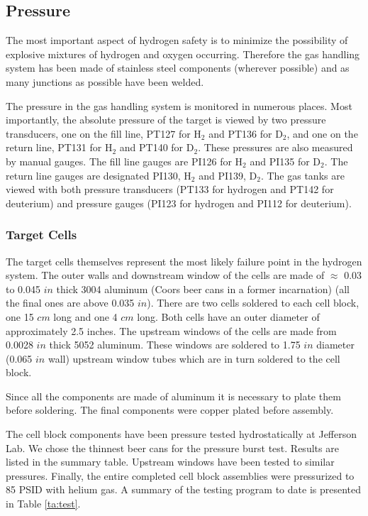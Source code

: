 {\subsection{ Pressure}

The most important aspect of hydrogen safety is to minimize the
possibility of explosive mixtures of hydrogen and oxygen occurring.
Therefore the gas handling system has been made of stainless steel
components (wherever possible) and as many junctions as possible have
been welded.

The pressure in the gas handling system is monitored in numerous
places. Most importantly, the absolute pressure of the target is
viewed by two pressure transducers, one on the fill line, PT127
for H$_2$ and PT136 for D$_2$, and one on the
return line, PT131 for H$_2$ and PT140 for D$_2$.
These pressures are also measured by manual gauges. The fill line gauges
are PI126 for H$_2$ and PI135 for D$_2$. The return line
gauges are designated PI130, H$_2$ and PI139, D$_2$. The gas tanks are viewed
with both pressure transducers (PT133 for hydrogen and PT142 for deuterium)
and pressure gauges (PI123 for hydrogen and PI112 for deuterium).

\subsubsection{ Target Cells}

The target cells themselves represent the most likely failure point
in the hydrogen system. The outer walls and downstream window 
of the cells are made of
$\approx$ 0.03 to 0.045 $in$ thick 3004 aluminum (Coors beer cans in a former
incarnation) (all the final ones are above 0.035 $in$). 
There are two cells soldered to each cell block, one 15 $cm$ long
and one 4 $cm$ long. Both cells have an outer diameter of 
approximately 2.5 inches.
The upstream windows of the cells are made from 0.0028 $in$ thick 5052
aluminum.
These windows are soldered to 1.75 $in$ diameter (0.065 $in$ wall)
upstream window tubes which are in turn soldered to the cell block.

Since all the components are made of aluminum it is necessary to plate
them before soldering. The final components were copper
plated before assembly. 

The cell block components have been pressure tested hydrostatically at
Jefferson Lab.
We chose the thinnest beer cans for the pressure burst test.
 Results are listed
in the summary table.
Upstream windows have been tested
to similar pressures. Finally, the entire completed cell block
assemblies were pressurized to 85 PSID with helium gas.
A summary of the testing program to date is presented
in Table \ref{ta:test}.

}
